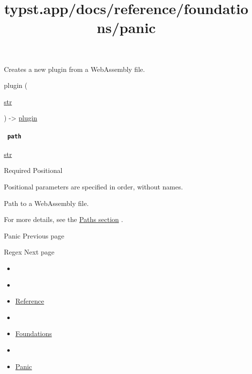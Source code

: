 Creates a new plugin from a WebAssembly file.

{ plugin } (

{ \href{/docs/reference/foundations/str/}{str} }

) -\textgreater{} \href{/docs/reference/foundations/plugin/}{plugin}

\paragraph{\texorpdfstring{\texttt{\ path\ }}{ path }}\label{constructor-path}

\href{/docs/reference/foundations/str/}{str}

{Required} {{ Positional }}

\label{constructor-path-positional-tooltip}
Positional parameters are specified in order, without names.

Path to a WebAssembly file.

For more details, see the \href{/docs/reference/syntax/\#paths}{Paths
section} .

\href{/docs/reference/foundations/panic/}{\pandocbounded{}}

{ Panic } { Previous page }

\href{/docs/reference/foundations/regex/}{\pandocbounded{}}

{ Regex } { Next page }


\title{typst.app/docs/reference/foundations/panic}

\begin{itemize}
\tightlist
\item
  \href{/docs}{}
\item
  
\item
  \href{/docs/reference/}{Reference}
\item
  
\item
  \href{/docs/reference/foundations/}{Foundations}
\item
  
\item
  \href{/docs/reference/foundations/panic/}{Panic}
\end{itemize}

